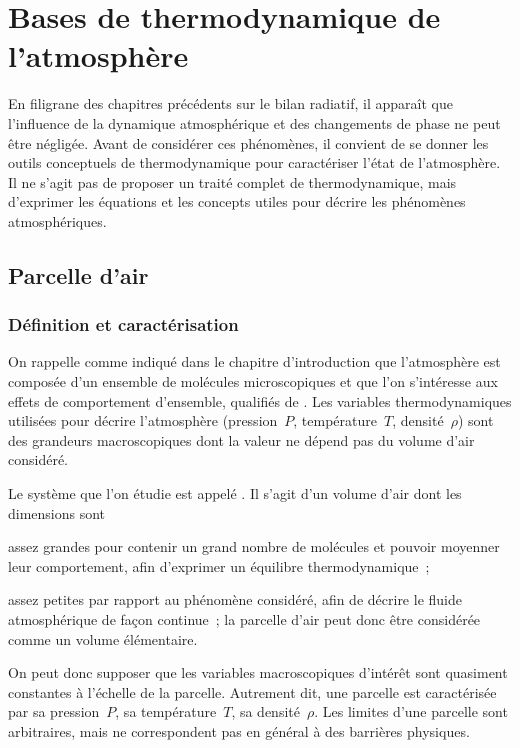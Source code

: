 \chapter{Bases de thermodynamique de l'atmosphère}


\bk
En filigrane des chapitres précédents sur le bilan radiatif, il apparaît que l'influence de la dynamique atmosphérique et des changements de phase ne peut être négligée. Avant de considérer ces phénomènes, il convient de se donner les outils conceptuels de thermodynamique pour caractériser l'état de l'atmosphère. Il ne s'agit pas de proposer un traité complet de thermodynamique, mais d'exprimer les équations et les concepts utiles pour décrire les phénomènes atmosphériques. 


\mk
\section{Parcelle d'air}

\sk
\subsection{Définition et caractérisation}

\sk
On rappelle comme indiqué dans le chapitre d'introduction que l'atmosphère est composée d'un ensemble de molécules microscopiques et que l'on s'intéresse aux effets de comportement d'ensemble, qualifiés de . Les variables thermodynamiques utilisées pour décrire l'atmosphère (pression~$P$, température~$T$, densité~$\rho$) sont des grandeurs macroscopiques  dont la valeur ne dépend pas du volume d'air considéré. 

\sk
Le système que l'on étudie est appelé . Il s'agit d'un volume d'air dont les dimensions sont %
\begin{citemize}
\item assez grandes pour contenir un grand nombre de molécules et pouvoir moyenner leur comportement, afin d'exprimer un équilibre thermodynamique~;
\item assez petites par rapport au phénomène considéré, afin de décrire le fluide atmosphérique de façon continue~; la parcelle d'air peut donc être considérée comme un volume élémentaire.
\end{citemize}
On peut donc supposer que les variables macroscopiques d'intérêt sont quasiment constantes à l'échelle de la parcelle. Autrement dit, une parcelle est caractérisée par sa pression~$P$, sa température~$T$, sa densité~$\rho$. Les limites d'une parcelle sont arbitraires, mais ne correspondent pas en général à des barrières physiques. 

